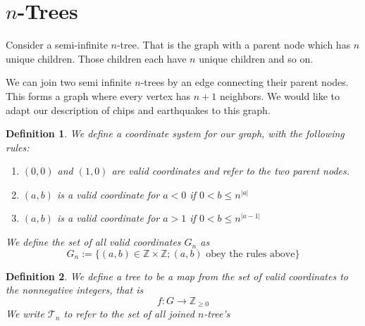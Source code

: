 \documentclass[11pt]{article}
\newtheorem{definition}{Definition}
\begin{document}
\section{$n$-Trees}
Consider a semi-infinite $n$-tree. That is the graph with a parent node which has $n$ unique children. Those children each have $n$ unique children and so on. 

We can join two semi infinite $n$-trees by an edge connecting their parent nodes. This forms a graph where every vertex has $n+1$ neighbors. We would like to adapt our description of chips and earthquakes to this graph. 

\begin{definition} We define a coordinate system for our graph, with the following rules:
\begin{enumerate}
	\item $(0,0)$ and $(1,0)$ are valid coordinates and refer to the two parent nodes.
	\item $(a,b)$ is a valid coordinate for $a<0$ if $0<b \leq n^{|a|}$
	\item $(a,b)$ is a valid coordinate for $a>1$ if $0<b \leq n^{|a-1|}$
\end{enumerate}
We define the set of all valid coordinates $G_n$ as 
\begin{equation}
G_n := \{ (a,b) \in \mathbb{Z} \times \mathbb{Z} ; (a,b) \text{ obey the rules above}\}
\end{equation}
\end{definition}

\begin{definition}
We define a tree to be a map from the set of valid coordinates to the nonnegative integers, that is 
\begin{equation}
f:  G\rightarrow \mathbb{Z}_{\geq 0}
\end{equation}
We write $\mathcal{T}_n$ to refer to the set of all joined $n$-tree's 
\end{definition}
\end{document}
